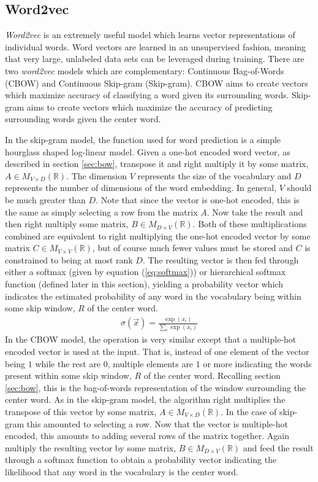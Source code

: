 \subsection{Word2vec}\label{sec:word2vec}
\textit{Word2vec} \cite{tm13_og} is an extremely useful model which learns vector representations of individual words.  Word vectors are learned in an unsupervised fashion, meaning that very large, unlabeled data sets can be leveraged during training.  There are two \textit{word2vec} models which are complementary:  Continuous Bag-of-Words (CBOW) and Continuous Skip-gram (Skip-gram).  CBOW aims to create vectors which maximize accuracy of classifying a word given its surrounding words.  Skip-gram aims to create vectors which maximize the accuracy of predicting surrounding words given the center word.

In the skip-gram model, the function used for word prediction is a simple hourglass shaped log-linear model.  Given a one-hot encoded word vector, as described in section \ref{sec:bow}, transpose it and right multiply it by some matrix, $A \in M_{V\times D}(\mathbb{R})$.  The dimension $V$ represents the size of the vocabulary and $D$ represents the number of dimensions of the word embedding.  In general, $V$ should be much greater than $D$.  Note that since the vector is one-hot encoded, this is the same as simply selecting a row from the matrix $A$.  Now take the result and then right multiply some matrix, $B \in M_{D\times V}(\mathbb{R})$.  Both of these multiplications combined are equivalent to right multiplying the one-hot encoded vector by some matrix $C \in M_{V\times V}(\mathbb{R})$, but of course much fewer values must be stored and $C$ is constrained to being at most rank $D$.  The resulting vector is then fed through either a softmax (given by equation (\ref{eq:softmax})) or hierarchical softmax function (defined later in this section), yielding a probability vector which indicates the estimated probability of any word in the vocabulary being within some skip window, $R$ of the center word.
\begin{align}\label{eq:softmax}
\sigma(\vec{x}) = \frac{\exp(x_i)}{ \sum_i \exp(x_i)}
\end{align}
In the CBOW model, the operation is very similar except that a multiple-hot encoded vector is used at the input.  That is, instead of one element of the vector being $1$ while the rest are $0$, multiple elements are $1$ or more indicating the words present within some skip window, $R$ of the center word.  Recalling section \ref{sec:bow}, this is the bag-of-words representation of the window surrounding the center word.  As in the skip-gram model, the algorithm right multiplies the transpose of this vector by some matrix, $A \in M_{V\times D}(\mathbb{R})$.  In the case of skip-gram this amounted to selecting a row.  Now that the vector is multiple-hot encoded, this amounts to adding several rows of the matrix together.  Again multiply the resulting vector by some matrix, $B \in M_{D\times V}(\mathbb{R})$ and feed the result through a softmax function to obtain a probability vector indicating the likelihood that any word in the vocabulary is the center word.

